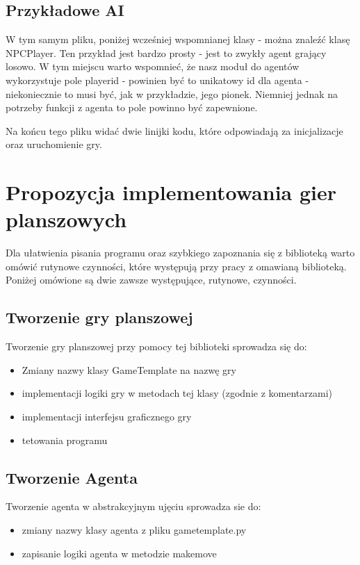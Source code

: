 \documentclass[declaration,shortabstract,inz]{iithesis}
\begin{document}
\subsection{Przykładowe AI}
W tym samym pliku, poniżej wcześniej wspomnianej klasy - można znaleźć klasę NPCPlayer. Ten przykład jest bardzo prosty - jest to zwykły agent grający losowo.
W tym miejscu warto wspomnieć, że nasz moduł do agentów wykorzystuje pole player\textunderscore id - powinien być to unikatowy id dla agenta - niekoniecznie to musi być, jak w przykładzie, jego pionek.
Niemniej jednak na potrzeby funkcji z agenta to pole powinno być zapewnione.

Na końcu tego pliku widać dwie linijki kodu, które odpowiadają za inicjalizacje oraz uruchomienie gry.
\section{Propozycja implementowania gier planszowych}
Dla ułatwienia pisania programu oraz szybkiego zapoznania się z biblioteką warto omówić rutynowe czynności, które występują przy pracy z omawianą biblioteką.
Poniżej omówione są dwie zawsze występujące, rutynowe, czynności.
\subsection{Tworzenie gry planszowej}
Tworzenie gry planszowej przy pomocy tej biblioteki sprowadza się do:
\begin{itemize}
  \item Zmiany nazwy klasy GameTemplate na nazwę gry
  \item implementacji logiki gry w metodach tej klasy (zgodnie z komentarzami)
  \item implementacji interfejsu graficznego gry
  \item tetowania programu
\end{itemize}

\subsection{Tworzenie Agenta}
Tworzenie agenta w abstrakcyjnym ujęciu sprowadza sie do:
\begin{itemize}
  \item zmiany nazwy klasy agenta z pliku game\textunderscore template.py
  \item zapisanie logiki agenta w metodzie make\textunderscore move
\end{itemize}
\end{document}
